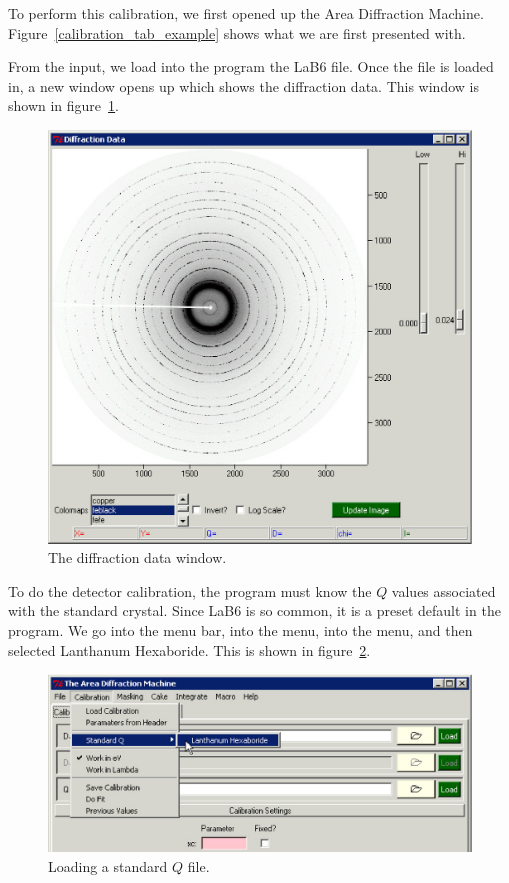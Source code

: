 To perform this calibration, we first opened up the Area 
Diffraction Machine. Figure~\ref{calibration_tab_example} shows what we
are first presented with.

From the  input, we load into the program the LaB6 
file. Once the file is loaded in, a new window opens up 
which shows the diffraction data. This window is shown in 
figure~\ref{diffraction_data_window_example}.

\begin{figure}
    \centering
    \includegraphics[scale=.75]{figures/diffraction_data_window_example.eps}
    \caption{The diffraction data window.}
    \label{diffraction_data_window_example}
\end{figure}

To do the detector calibration, the program must know the 
$Q$ values associated 
with the standard crystal. Since LaB6 is so common, it is
a preset default in the program. We go into the menu bar, 
into the  menu, into the  menu, 
and then selected Lanthanum Hexaboride. This is shown
in figure~\ref{standard_q_example}.

\begin{figure}
    \centering
    \includegraphics[scale=.75]{figures/standard_q.eps}
    \caption{Loading a standard $Q$ file.}
    \label{standard_q_example}
\end{figure}

